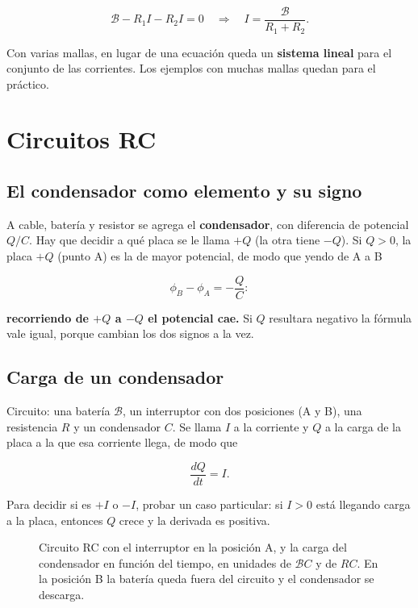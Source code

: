 \documentclass[12pt,a4paper]{article}
\begin{document}
\[
\mathcal{B} - R_1 I - R_2 I = 0
\quad\Longrightarrow\quad
I = \frac{\mathcal{B}}{R_1 + R_2} .
\]

Con varias mallas, en lugar de una ecuación queda un \textbf{sistema lineal} para el
conjunto de las corrientes. Los ejemplos con muchas mallas quedan para el
práctico.

\section{Circuitos RC}

\subsection{El condensador como elemento y su signo}

A cable, batería y resistor se agrega el \textbf{condensador}, con diferencia de
potencial $Q/C$. Hay que decidir a qué placa se le llama $+Q$ (la otra tiene
$-Q$). Si $Q>0$, la placa $+Q$ (punto A) es la de mayor potencial, de modo que
yendo de A a B

\[
\phi_B - \phi_A = -\frac{Q}{C} :
\]

\textbf{recorriendo de $+Q$ a $-Q$ el potencial cae.} Si $Q$ resultara negativo la
fórmula vale igual, porque cambian los dos signos a la vez.

\subsection{Carga de un condensador}

Circuito: una batería $\mathcal{B}$, un interruptor con dos posiciones (A y B),
una resistencia $R$ y un condensador $C$. Se llama $I$ a la corriente y $Q$ a
la carga de la placa a la que esa corriente llega, de modo que

\[
\frac{dQ}{dt} = I .
\]

\begin{warnbox}
Para decidir si es $+I$ o $-I$, probar un caso
particular: si $I>0$ está llegando carga a la placa, entonces $Q$ crece y la
derivada es positiva.
\end{warnbox}

\begin{figure}[H]
  \centering
  
  \caption{Circuito RC con el interruptor en la posición A, y la carga del condensador en función del tiempo, en unidades de $\mathcal{B}C$ y de $RC$. En la posición B la batería queda fuera del circuito y el condensador se descarga.}
\end{figure}
\end{document}

